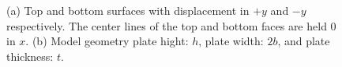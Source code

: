 \begin{figure}%
    \centering
    \qquad
    \caption{(a) Top and bottom surfaces with displacement in $+y$ and $-y$ respectively. The center lines of the top and bottom faces are held $0$ in $x$. (b) Model geometry plate hight: $h$, plate width: $2b$, and plate thickness: $t$.}%
    \label{fig:model_params}%
\end{figure}

